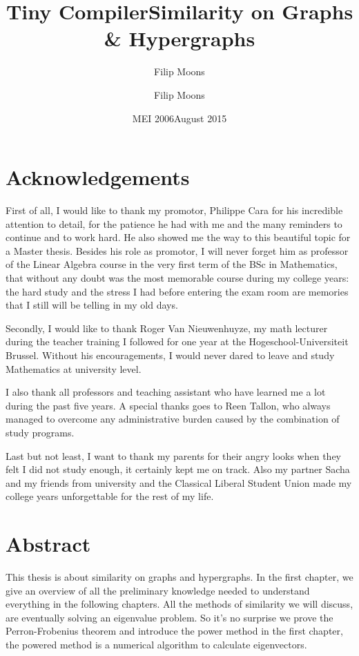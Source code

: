 \documentclass[a4paper,11pt]{report}
\author{Filip Moons}
\title{Tiny Compiler}
\author{Filip Moons}
\title{Similarity on Graphs \& Hypergraphs}
\date{MEI 2006}
\date{August 2015}
\begin{document}
\maketitlepage
\chapter*{Acknowledgements}
First of all, I would like to thank my promotor, Philippe Cara for his incredible attention to detail, 
for the patience he had with me and the many reminders to continue and to work 
hard. He also showed me the way to this beautiful topic for a Master thesis. Besides his role as 
promotor, I will never forget him as professor of the Linear Algebra course in 
the very first term of the BSc in Mathematics, that without any doubt was the 
most memorable course during my college years: the hard study and the stress I 
had before entering the exam room are memories that I still will be telling in my 
old days.

Secondly, I would like to thank Roger Van Nieuwenhuyze, my math lecturer during 
the teacher training I followed for one year at the Hogeschool-Universiteit Brussel. Without his encouragements, I would never dared to leave
and study Mathematics at university level. 

I also thank all professors and teaching assistant who have learned me a 
lot during the past five years. A special thanks goes to Reen Tallon, who 
always managed to overcome any administrative burden caused by the combination 
of study programs.

Last but not least, I want to thank my parents for their angry looks when they 
felt I did not study enough, it certainly kept me on track. Also my partner Sacha and my friends from university and the Classical Liberal Student  
Union made my college years unforgettable for the rest of my life.


 
\chapter*{Abstract}
This thesis is about similarity on graphs and hypergraphs. In the first chapter, 
we give an overview of all the preliminary knowledge needed to understand 
everything in the following chapters. All the methods of similarity we will 
discuss, are eventually solving an eigenvalue problem. So it's no surprise we 
prove the Perron-Frobenius theorem and introduce the power method in the first 
chapter, the powered method is a numerical algorithm to calculate eigenvectors.
\end{document}
